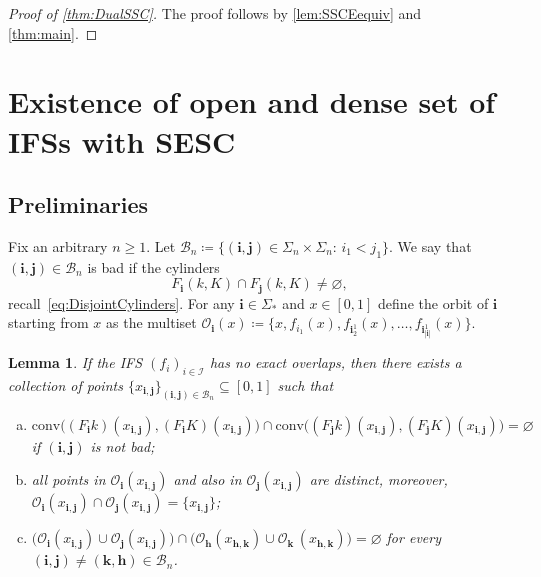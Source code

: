 \documentclass[11pt,]{article}
\def\cref#1{\ref{#1}}%
\newtheorem{lemma}[theorem]{Lemma}
\theoremstyle{definition}
\theoremstyle{remark}
\newcommand{\0}{\mathbf{0}}
\newcommand{\bi}{\mathbf{i}}
\newcommand{\bj}{\mathbf{j}}
\newcommand{\bk}{{\mathbf{k}}}
\newcommand{\bh}{{\mathbf{h}}}
\begin{document}
\begin{proof}[Proof of \cref{thm:DualSSC}]
	The proof follows by \cref{lem:SSCEequiv} and \cref{thm:main}.
\end{proof}

\section{Existence of open and dense set of IFSs with SESC}\label{sec:ProofESCOpenDense}

\subsection{Preliminaries}

Fix an arbitrary $n\geq 1$. Let $\mathcal{B}_n\coloneqq\{(\bi,\bj)\in\Sigma_n\times\Sigma_n:\,
i_1<j_1\}$. We say that $(\bi,\bj)\in\mathcal{B}_n$ is bad if the cylinders
\begin{equation}\label{eq:DefBad}
F_{\bi}(k,K)\cap F_{\bj}(k,K)\neq\varnothing,
\end{equation}
recall~\cref{eq:DisjointCylinders}. For any $\bi\in\Sigma_*$ and $x\in[0,1]$ define the orbit of
$\bi$ starting from $x$ as the multiset $\mathcal{O}_{\bi}(x)\coloneqq \{x,f_{i_1}(x),
f_{\bi_2^1}(x),\ldots,f_{\bi_{|\bi|}^1}(x)\}$. 


\begin{lemma}\label{lem:Pointsx_ij}
If the IFS $(f_i)_{i\in\mathcal{I}}$ has no exact overlaps, then there exists a collection of points
$\{x_{\bi,\bj}\}_{(\bi,\bj)\in\mathcal{B}_n}\subseteq[0,1]$ such that
\begin{enumerate}[(a)]
\item $\mathrm{conv}\big((F_{\bi}k)(x_{\bi,\bj}), (F_{\bi}K)(x_{\bi,\bj})\big) \cap \mathrm{conv}\big((F_{\bj}k)(x_{\bi,\bj}),
	(F_{\bj}K)(x_{\bi,\bj})\big)= \varnothing$ if $(\bi,\bj)$ is not bad;  
\item all points in $\mathcal{O}_{\bi}(x_{\bi,\bj})$ and also in $\mathcal{O}_{\bj}(x_{\bi,\bj})$
  are distinct, moreover,
  $\mathcal{O}_{\bi}(x_{\bi,\bj})\cap\mathcal{O}_{\bj}(x_{\bi,\bj})=\{x_{\bi,\bj}\}$;
\item $\big(\mathcal{O}_{\bi}(x_{\bi,\bj})\cup \mathcal{O}_{\bj}(x_{\bi,\bj})\big) \cap
  \big(\mathcal{O}_{\bh}(x_{\bh,\bk})\cup
  \mathcal{O}_{\bk}\,(x_{\bh,\bk})\big)=\varnothing$ for every $(\bi,\bj)\neq
  (\bk,\bh)\in\mathcal{B}_n$.
\end{enumerate} 
\end{lemma}
\end{document}
